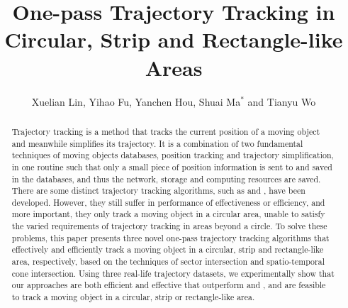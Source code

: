 \documentclass[sigconf]{acmart}
\newcommand{\ldrh}{\kw{LDRH}}
\newcommand{\grts}{\kw{GRTS}}
\begin{document}
\title{One-pass Trajectory Tracking in Circular, Strip and Rectangle-like Areas}



 \author{Xuelian Lin, Yihao Fu, Yanchen Hou, Shuai Ma$^*$ and Tianyu Wo}






\renewcommand{\shortauthors}{XXX et al.}


\begin{abstract}
Trajectory tracking is a method that tracks the current position of a moving object and meanwhile simplifies its trajectory. It is a combination of two fundamental techniques of moving objects databases, position tracking and trajectory simplification, in one routine such that only a small piece of position information is sent to and saved in the databases, and thus the network, storage and computing resources are saved.
%
There are some distinct trajectory tracking algorithms, such as \ldrh and \grts, have been developed. However, they still suffer in performance of effectiveness or efficiency, and more important, they only track a moving object in a circular area, unable to satisfy the varied requirements of trajectory tracking in areas beyond a circle. 
%
To solve these problems, this paper presents three novel one-pass trajectory tracking algorithms that effectively and efficiently track a moving object in a circular, strip and rectangle-like area, respectively, based on the techniques of sector intersection and spatio-temporal cone intersection.
%
Using three real-life trajectory datasets, we experimentally show that our approaches are both efficient and effective that outperform \ldrh and \grts, and are feasible to track a moving object in a circular, strip or rectangle-like area.
\end{abstract}
\end{document}
